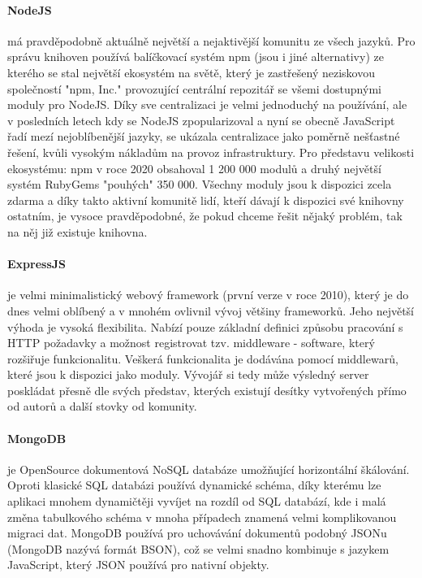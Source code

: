 \paragraph{NodeJS} má pravděpodobně aktuálně největší a nejaktivější komunitu ze všech jazyků. Pro správu knihoven používá balíčkovací systém npm (jsou i jiné alternativy) ze kterého se stal největší ekosystém na světě, který je zastřešený neziskovou společností "npm, Inc." provozující centrální repozitář se všemi dostupnými moduly pro NodeJS. Díky sve centralizaci je velmi jednoduchý na používání, ale v posledních letech kdy se NodeJS zpopularizoval a nyní se obecně JavaScript řadí mezí nejoblíbenější jazyky, se ukázala centralizace jako poměrně nešťastné řešení, kvůli vysokým nákladům na provoz infrastruktury. Pro představu velikosti ekosystému: npm v roce 2020 obsahoval 1 200 000 modulů a druhý největší systém RubyGems "pouhých" 350 000. Všechny moduly jsou k dispozici zcela zdarma a díky takto aktivní komunitě lidí, kteří dávají k dispozici své knihovny ostatním, je vysoce pravděpodobné, že pokud chceme řešit nějaký problém, tak na něj již existuje knihovna.

\paragraph{ExpressJS} je velmi minimalistický webový framework (první verze v roce 2010), který je do dnes velmi oblíbený a v mnohém ovlivnil vývoj většiny frameworků. Jeho největší výhoda je vysoká flexibilita. Nabízí pouze základní definici způsobu pracování s HTTP požadavky a možnost registrovat tzv. middleware - software, který rozšiřuje funkcionalitu. Veškerá funkcionalita je dodávána pomocí middlewarů, které jsou k dispozici jako moduly. Vývojář si tedy může výsledný server poskládat přesně dle svých představ, kterých existují desítky vytvořených přímo od autorů a další stovky od komunity.

\paragraph{MongoDB} je OpenSource dokumentová NoSQL databáze umožňující horizontální škálování. Oproti klasické SQL databázi používá dynamické schéma, díky kterému lze aplikaci mnohem dynamičtěji vyvíjet na rozdíl od SQL databází, kde i malá změna tabulkového schéma v mnoha případech znamená velmi komplikovanou migraci dat. MongoDB používá pro uchovávání dokumentů podobný JSONu (MongoDB nazývá formát BSON), což se velmi snadno kombinuje s jazykem JavaScript, který JSON používá pro nativní objekty.

